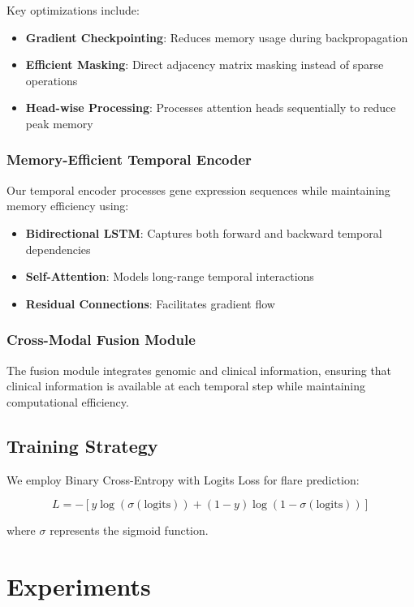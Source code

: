 \documentclass[10pt,twocolumn]{article}
\begin{document}
Key optimizations include:
\begin{itemize}
\item \textbf{Gradient Checkpointing}: Reduces memory usage during backpropagation
\item \textbf{Efficient Masking}: Direct adjacency matrix masking instead of sparse operations
\item \textbf{Head-wise Processing}: Processes attention heads sequentially to reduce peak memory
\end{itemize}

\subsubsection{Memory-Efficient Temporal Encoder}

Our temporal encoder processes gene expression sequences while maintaining memory efficiency using:
\begin{itemize}
\item \textbf{Bidirectional LSTM}: Captures both forward and backward temporal dependencies
\item \textbf{Self-Attention}: Models long-range temporal interactions
\item \textbf{Residual Connections}: Facilitates gradient flow
\end{itemize}

\subsubsection{Cross-Modal Fusion Module}

The fusion module integrates genomic and clinical information, ensuring that clinical information is available at each temporal step while maintaining computational efficiency.

\subsection{Training Strategy}

We employ Binary Cross-Entropy with Logits Loss for flare prediction:

$$L = -[y \log(\sigma(\text{logits})) + (1-y) \log(1-\sigma(\text{logits}))]$$

where $\sigma$ represents the sigmoid function.

\section{Experiments}
\end{document}

